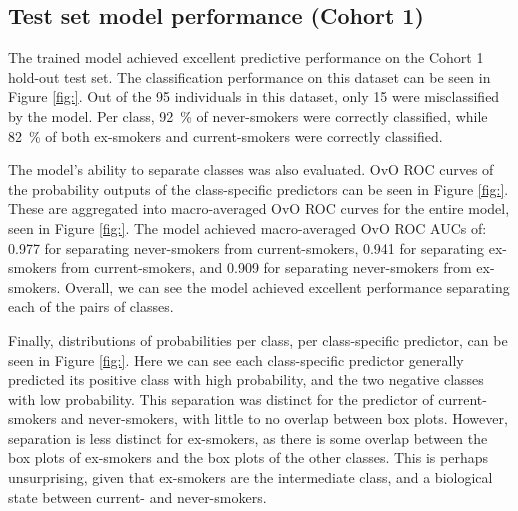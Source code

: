 \documentclass[draft]{article}
\begin{document}

\subsection{Test set model performance (Cohort 1)} \label{sec:cohort1-performance}
The trained model achieved excellent predictive performance on the Cohort 1 hold-out test set. The classification performance on this dataset can be seen in Figure \ref{fig:}. Out of the 95 individuals in this dataset, only 15 were misclassified by the model. Per class, \SI{92}{\percent} of never-smokers were correctly classified, while \SI{82}{\percent} of both ex-smokers and current-smokers were correctly classified.

The model's ability to separate classes was also evaluated. OvO ROC curves of the probability outputs of the class-specific predictors can be seen in Figure \ref{fig:}. These are aggregated into macro-averaged OvO ROC curves for the entire model, seen in Figure \ref{fig:}. The model achieved macro-averaged OvO ROC AUCs of: 0.977 for separating never-smokers from current-smokers, 0.941 for separating ex-smokers from current-smokers, and 0.909 for separating never-smokers from ex-smokers. Overall, we can see the model achieved excellent performance separating each of the pairs of classes.

Finally, distributions of probabilities per class, per class-specific predictor, can be seen in Figure \ref{fig:}. Here we can see each class-specific predictor generally predicted its positive class with high probability, and the two negative classes with low probability. This separation was distinct for the predictor of current-smokers and never-smokers, with little to no overlap between box plots. However, separation is less distinct for ex-smokers, as there is some overlap between the box plots of ex-smokers and the box plots of the other classes. This is perhaps unsurprising, given that ex-smokers are the intermediate class, and a biological state between current- and never-smokers. 
\end{document}
